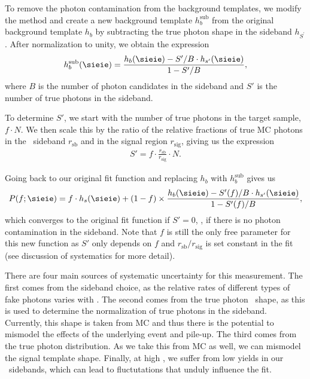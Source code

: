 To remove the photon contamination from the background templates, we modify the method and create a new background template $h_{b}^{\text{sub}}$ from the original background template $h_{b}$ by subtracting the true photon shape in the sideband $h_{S^{'}}$. 
After normalization to unity, we obtain the expression
\begin{align}
  h_{b}^{\text{sub}}(\sieie) = \frac{h_{b}(\sieie) - S'/B \cdot h_{s'}(\sieie)}{1 - S'/B},
\end{align}
where $B$ is the number of photon candidates in the sideband and $S'$ is the number of true photons in the sideband.

To determine $S'$, we start with the number of true photons in the target sample, $f \cdot N$. 
We then scale this by the ratio of the relative fractions of true MC photons in the \ICH\ sideband $r_{\text{sb}}$ and in the signal region $r_{\text{sig}}$, giving us the expression
\begin{align}
  S' = f \cdot \frac{r_{\text{sb}}}{r_{\text{sig}}} \cdot N .
\end{align}

Going back to our original fit function and replacing $h_{b}$ with $h_{b}^{\text{sub}}$ gives us
\begin{align}
  P(f;\sieie) = f \cdot h_{s}(\sieie) + (1 - f) \times \frac{h_{b}(\sieie) - S'(f)/B \cdot h_{s'}(\sieie)}{1 - S'(f)/B},
\end{align}
which converges to the original fit function if $S' = 0$, \ie, if there is no photon contamination in the sideband. 
Note that $f$ is still the only free parameter for this new function as $S'$ only depends on $f$ and $r_{\text{sb}} / r_{\text{sig}}$ is set constant in the fit (see discussion of systematics for more detail).

There are four main sources of systematic uncertainty for this measurement. 
The first comes from the sideband choice, as the relative rates of different types of fake photons varies with \ICH. 
The second comes from the true photon \ICH\ shape, as this is used to determine the normalization of true photons in the sideband. 
Currently, this shape is taken from MC and thus there is the potential to mismodel the effects of the underlying event and pile-up. 
The third comes from the true photon \sieie distribution. 
As we take this from MC as well, we can mismodel the signal template shape. 
Finally, at high \pt, we suffer from low yields in our \ICH\ sidebands, which can lead to
fluctutations that unduly influence the fit.

